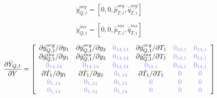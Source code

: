 \documentclass[a4paper,10pt]{article}
\newcommand{\zm}[1]{\ensuremath{ {\color{opaqueblue} 0_{#1} } }}
\begin{document}
\begin{equation}
\dot{y}_{Q,i}^{org} = [0, 0, \ddot{\bar{p}}_{T,i}^{org}, \ddot{\bar{q}}_{T,i}^{org}]
\end{equation}

\begin{equation}
\dot{y}_{Q,i}^{ins} = [0, 0, \ddot{\bar{p}}_{T,i}^{ins}, \ddot{\bar{q}}_{T,i}^{ins}]
\end{equation}

\begin{equation}
\frac{\partial\dot{Y}_{Q,1}}{\partial Y}=
\left[ \begin{array}{cccccc}
\partial\dot{y}_{Q,1}^{org} / \partial y_1 & \partial\dot{y}_{Q,1}^{org} / \partial y_2 & \zm{14,14} & \partial\dot{y}_{Q,1}^{org} / \partial T_1 & \zm{14,1} & \zm{14,1} \\
\partial\dot{y}_{Q,1}^{ins} / \partial y_1 & \partial\dot{y}_{Q,1}^{ins} / \partial y_2 & \zm{14,14} & \partial\dot{y}_{Q,1}^{ins} / \partial T_1 & \zm{14,1} & \zm{14,1} \\
\zm{14,14}                                 & \zm{14,14}                                 & \zm{14,14} & \zm{14,1}                                  & \zm{14,1} & \zm{14,1} \\
\partial\dot{T}_1 / \partial y_1           & \partial\dot{T}_1 / \partial y_2           & \zm{1,14}  & \partial\dot{T}_1 / \partial T_1           & \zm{}     & \zm{} \\
\zm{1,14}                                  & \zm{1,14}                                  & \zm{1,14}  & \zm{}                                      & \zm{}     & \zm{} \\
\zm{1,14}                                  & \zm{1,14}                                  & \zm{1,14}  & \zm{}                                      & \zm{}     & \zm{} \\
\end{array}  \right]
\end{equation}
\end{document}
